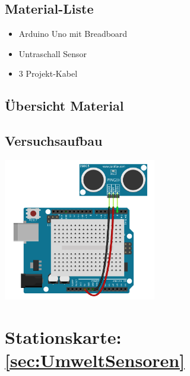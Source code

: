 \margininfo{}
\begin{multicols}{2}
\subsection*{Material-Liste}
\begin{itemize}
  \item Arduino Uno mit Breadboard
  \item Untraschall Sensor
  \item 3 Projekt-Kabel
\end{itemize}

\subsection*{Übersicht Material}

\vfill\null 
\columnbreak

\subsection*{Versuchsaufbau}

\includegraphics[width=0.5\textwidth]{Kapitel2/Bilder/ping}
\end{multicols}

\section*{Stationskarte: \ref{sec:UmweltSensoren} }

